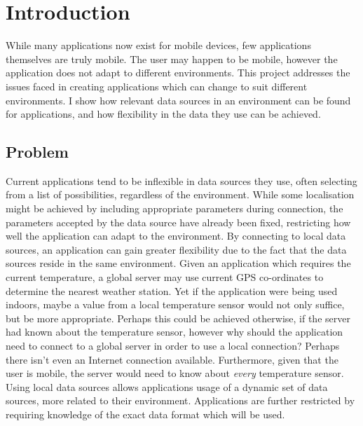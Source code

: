 \documentclass[12pt,twoside,notitlepage]{report}
\begin{document}
\bigskip
{}

\cleardoublepage

\tableofcontents

\listoffigures

\newpage


\cleardoublepage        %

\setcounter{page}{1}
\pagestyle{headings}

\chapter{Introduction}

While many applications now exist for mobile devices, few applications themselves are truly mobile. 
The user may happen to be mobile, however the application does not adapt to different environments. 
This project addresses the issues faced in creating applications which can change to suit different environments. 
I show how relevant data sources in an environment can be found for applications, and how flexibility in the data they use can be achieved. 

\section{Problem}

Current applications tend to be inflexible in data sources they use, often selecting from a list of possibilities, regardless of the environment. 
While some localisation might be achieved by including appropriate parameters during connection, the parameters accepted by the data source have already been fixed, restricting how well the application can adapt to the environment. 
By connecting to local data sources, an application can gain greater flexibility due to the fact that the data sources reside in the same environment.
Given an application which requires the current temperature, a global server may use current GPS co-ordinates to determine the nearest weather station. 
Yet if the application were being used indoors, maybe a value from a local temperature sensor would not only suffice, but be more appropriate. 
Perhaps this could be achieved otherwise, if the server had known about the temperature sensor, however why should the application need to connect to a global server in order to use a local connection? Perhaps there isn't even an Internet connection available. 
Furthermore, given that the user is mobile, the server would need to know about {\sl every} temperature sensor. 
Using local data sources allows applications usage of a dynamic set of data sources, more related to their environment. 
Applications are further restricted by requiring knowledge of the exact data format which will be used. 
\end{document}
